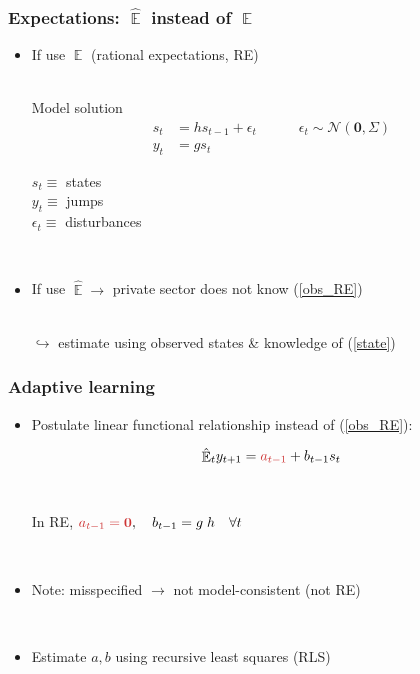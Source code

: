 \documentclass[11pt]{beamer}
\DeclareMathOperator{\E}{\mathbb{E}}
\begin{document}
\begin{frame}
	\frametitle{Expectations: $\hat{\E}$ instead of $\E$}

\begin{itemize}
\item If use $\E$ (rational expectations, RE) \\

\

Model solution 
 \begin{align}
 s_t & = h s_{t-1} + \epsilon_t \quad \quad \quad \epsilon_t \sim \mathcal{N}(\mathbf{0},\Sigma) \label{state} \\
 y_t & = g s_t \label{obs_RE}
 \end{align}


$s_t \equiv $ states \\
$y_t \equiv $ jumps \\
$\epsilon_t \equiv $ disturbances
\

\pause

\

\item If use $\hat{\E} \rightarrow$ private sector does not know (\ref{obs_RE}) \\

\

$\hookrightarrow$ estimate using observed states \& knowledge of (\ref{state})

\end{itemize}



\end{frame}

\begin{frame}
	\frametitle{Adaptive learning}
	\label{adaptive_learning}

\begin{itemize}
\item Postulate linear functional relationship instead of (\ref{obs_RE}):

\begin{equation}
\hat{\E}_t y_{t+1} = \textcolor{brownreddark}{a_{t-1}} + b_{t-1}s_t  \label{PLM_fcst_general}
\end{equation}

\

\pause

In RE, $\textcolor{brownreddark}{a_{t-1} = \mathbf{0}}, \quad b_{t-1} = g\;h \quad \forall t$

\

\pause
  


\item Note: \textcolor{brownreddark}{misspecified}	$\rightarrow$ not model-consistent (not RE) 

\

\pause


\item Estimate $a, b$ using recursive least squares (RLS)


\end{itemize}


\end{frame}
\end{document}
